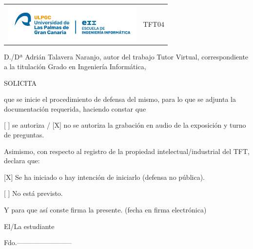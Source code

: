 
\thispagestyle{empty}

\begin{tabular}{p{15cm}p{5cm}}
  \includegraphics[width=7cm]{Ilustraciones/NuevoLogoEII.png}   &  TFT04\\
\end{tabular}

\vspace{1em}
\fboxrule=2pt
\begin{center}
\end{center}

\vspace{1em}
\justify
D./Dª Adrián Talavera Naranjo, autor del trabajo Tutor Virtual, correspondiente a la titulación Grado en Ingeniería Informática,

\vspace{1em}
SOLICITA

\vspace{1em}
que se inicie el procedimiento de defensa del mismo, para lo que se adjunta la documentación requerida, haciendo constar que 

[ ] se autoriza / [X] no se autoriza la grabación en audio de la exposición y turno de preguntas.

\vspace{1em}
Asimismo, con respecto al registro de la propiedad intelectual/industrial del TFT, declara que:

[X] Se ha iniciado o hay intención de iniciarlo (defensa no pública).

[ ] No está previsto.

\vspace{1em}
Y para que así conste firma la presente. (fecha en firma electrónica)

\begin{center}

\vspace{1em}
El/La estudiante

\vspace{3em}
Fdo.------------------------
\end{center}

